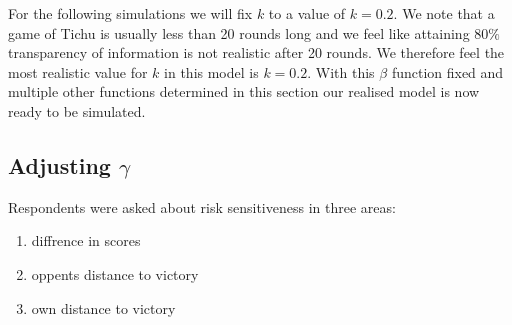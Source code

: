 For the following simulations we will fix $k$ to a value of $k = 0.2$. We note that a game of Tichu is usually less than 20 rounds long and we feel like attaining $80\%$ transparency of information is not realistic after 20 rounds. We therefore feel the most realistic value for $k$ in this model is $k = 0.2$. With this $\beta$ function fixed and multiple other functions determined in this section our realised model is now ready to be simulated.
\subsection{Adjusting $\gamma$}

Respondents were asked about risk sensitiveness in three areas:
\begin{enumerate}[(1)]
\item diffrence in scores
\item oppents distance to victory
\item own distance to victory
\end{enumerate}

